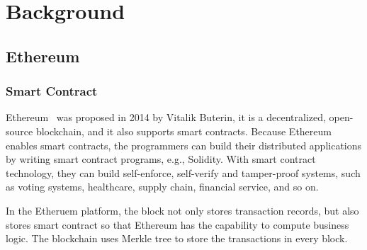\chapter{Background}
\label{chapter:background}

\section{Ethereum}
    \subsection{Smart Contract}
        Ethereum~\cite{buterin2014next} was proposed in 2014 by Vitalik Buterin, it is a decentralized, open-source blockchain, and it also supports smart contracts. Because Ethereum enables smart contracts, the programmers can build their distributed applications by writing smart contract programs, e.g., Solidity. With smart contract technology, they can build self-enforce, self-verify and tamper-proof systems, such as voting systems, healthcare, supply chain, financial service, and so on. \par        
        In the Etheruem platform, the block not only stores transaction records, but also stores smart contract so that Ethereum has the capability to compute business logic. The blockchain uses Merkle tree to store the transactions in every block.\par


